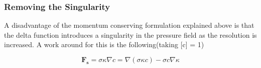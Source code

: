\subsubsection{Removing the Singularity}

A disadvantage of the momentum conserving formulation explained above is that the delta function introduces a singularity in the pressure field as the resolution is increased. A work around for this is the following(taking [c] = 1)

\begin{equation}
 \mathbf{F_s} = \sigma \kappa \nabla c = \nabla(\sigma \kappa c) - \sigma c \nabla \kappa
\end{equation}
\noindent